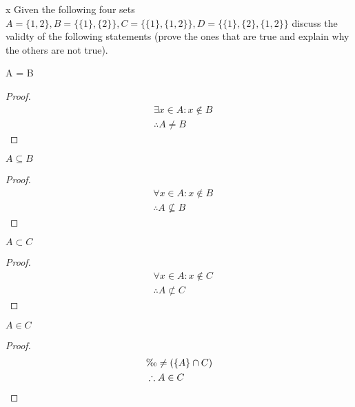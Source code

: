 \begin{question}x
  Given the following four sets
  \begin{math}
    A = \{1, 2\}, B = \{\{1\}, \{2\}\}, C = \{\{1\},\{1, 2\}\}, D = \{\{1\}, \{2\}, \{1, 2\}\}
  \end{math}
  discuss the validty of the following statements (prove the ones that are true and explain why the others are not true).

  \begin{subquestion}
    A = B
  \end{subquestion}
  \begin{proof}
    \begin{equation}
      \begin{split}
        & \exists x \in A: x \notin B \\
        & \therefore A \neq B
      \end{split}
    \end{equation}
  \end{proof}

  \begin{subquestion}
    $A \subseteq B$
  \end{subquestion}
  \begin{proof}
    \begin{equation}
      \begin{split}
        & \forall x \in A: x \notin B \\
        & \therefore A \nsubseteq B
      \end{split}
    \end{equation}
  \end{proof}

  \begin{subquestion}
    $A \subset C$
  \end{subquestion}
  \begin{proof}
    \begin{equation}
      \begin{split}
        & \forall x \in A: x \notin C \\
        & \therefore A \not \subset C
      \end{split}
    \end{equation}
  \end{proof}

  \begin{subquestion}
    $A \in C$
  \end{subquestion}
  \begin{proof}
    \begin{equation}
      \begin{split}
        & \O \neq (\{A\} \cap C) \\
        & \therefore A \in C
      \end{split}
    \end{equation}
  \end{proof}


\end{question}
